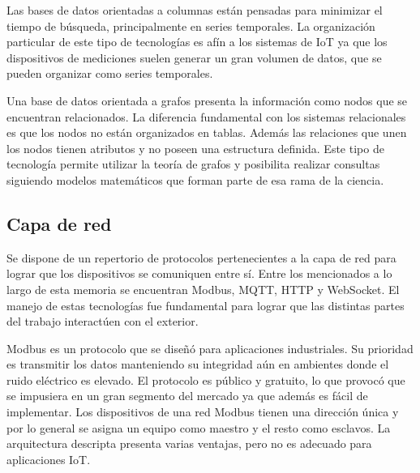 Las bases de datos orientadas a columnas están pensadas para minimizar el tiempo de búsqueda, principalmente en series temporales.
La organización particular de este tipo de tecnologías es afín a los sistemas de IoT ya que los dispositivos de mediciones suelen generar un gran volumen de datos, que se pueden organizar como series temporales.

Una base de datos orientada a grafos presenta la información como nodos que se encuentran relacionados.
La diferencia fundamental con los sistemas relacionales es que los nodos no están organizados en tablas.
Además las relaciones que unen los nodos tienen atributos y no poseen una estructura definida.
Este tipo de tecnología permite utilizar la teoría de grafos y posibilita realizar consultas siguiendo modelos matemáticos que forman parte de esa rama de la ciencia.


\newpage

\subsection{Capa de red}
Se dispone de un repertorio de protocolos pertenecientes a la capa de red para lograr que los dispositivos se comuniquen entre sí.
Entre los mencionados a lo largo de esta memoria se encuentran Modbus, MQTT, HTTP y WebSocket. El manejo de estas tecnologías fue fundamental para lograr que las distintas partes del trabajo interactúen con el exterior.

Modbus es un protocolo que se diseñó para aplicaciones industriales.
Su prioridad es transmitir los datos manteniendo su integridad aún en ambientes donde el ruido eléctrico es elevado. El protocolo es público y gratuito, lo que provocó que se impusiera en un gran segmento del mercado ya que además es fácil de implementar.
Los dispositivos de una red Modbus tienen una dirección única y por lo general se asigna un equipo como maestro y el resto como esclavos. La arquitectura descripta presenta varias ventajas, pero no es adecuado para aplicaciones IoT.

